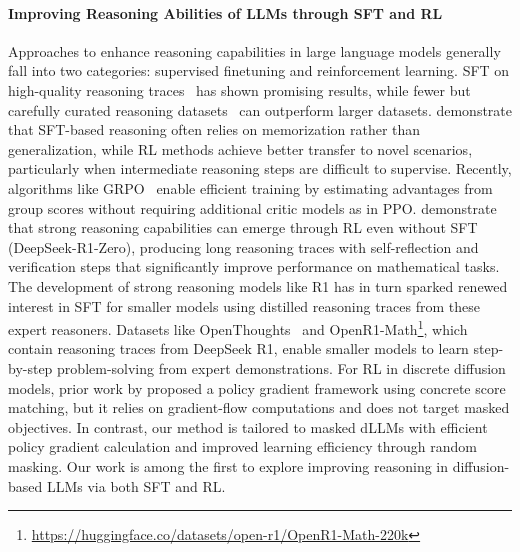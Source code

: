 \paragraph{Improving Reasoning Abilities of LLMs through SFT and RL}
Approaches to enhance reasoning capabilities in large language models generally fall into two categories: supervised finetuning and reinforcement learning. SFT on high-quality reasoning traces~\citep{yu2023metamath, numina_math_datasets, pasteropenwebmath} has shown promising results, while fewer but carefully curated reasoning datasets~\citep{ye2025limoreasoning, muennighoff2025s1, zhou2023lima} can outperform larger datasets. \citet{chu2025sft} demonstrate that SFT-based reasoning often relies on memorization rather than generalization, while RL methods achieve better transfer to novel scenarios, particularly when intermediate reasoning steps are difficult to supervise. Recently, algorithms like GRPO~\citep{guo2025deepseek, shao2024deepseekmath} enable efficient training by estimating advantages from group scores without requiring additional critic models as in PPO. \citet{guo2025deepseek} demonstrate that strong reasoning capabilities can emerge through RL even without SFT (DeepSeek-R1-Zero), producing long reasoning traces with self-reflection and verification steps that significantly improve performance on mathematical tasks. The development of strong reasoning models like R1 has in turn sparked renewed interest in SFT for smaller models using distilled reasoning traces from these expert reasoners. Datasets like OpenThoughts~\citep{openthoughts} and OpenR1-Math\footnote{\url{https://huggingface.co/datasets/open-r1/OpenR1-Math-220k}}, which contain reasoning traces from DeepSeek R1, enable smaller models to learn step-by-step problem-solving from expert demonstrations. For RL in discrete diffusion models, prior work by \citet{zekri2025fine} proposed a policy gradient framework using concrete score matching, but it relies on gradient-flow computations and does not target masked objectives. In contrast, our method is tailored to masked dLLMs with efficient policy gradient calculation and improved learning efficiency through random masking. Our work is among the first to explore improving reasoning in diffusion-based LLMs via both SFT and RL.


